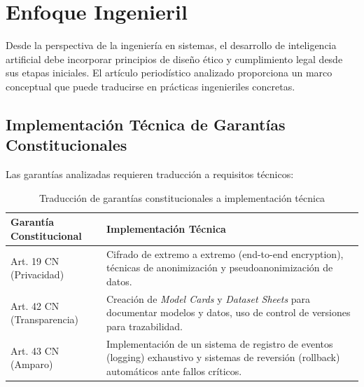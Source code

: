\documentclass[10pt, a4paper]{article}
\begin{document}
\onecolumn %

\section{Enfoque Ingenieril}
\label{sec:enfoque_ingenieril}

Desde la perspectiva de la ingeniería en sistemas, el desarrollo de inteligencia artificial debe incorporar principios de diseño ético y cumplimiento legal desde sus etapas iniciales. El artículo periodístico analizado proporciona un marco conceptual que puede traducirse en prácticas ingenieriles concretas.

\subsection{Implementación Técnica de Garantías Constitucionales}
Las garantías analizadas requieren traducción a requisitos técnicos:

\begin{table}[h]
\centering
\caption{Traducción de garantías constitucionales a implementación técnica}
\begin{tabularx}{\textwidth}{lX}
\toprule
\textbf{Garantía Constitucional} & \textbf{Implementación Técnica} \\
\midrule
Art. 19 CN (Privacidad) & Cifrado de extremo a extremo (end-to-end encryption), técnicas de anonimización y pseudoanonimización de datos. \\
\addlinespace
Art. 42 CN (Transparencia) & Creación de \textit{Model Cards} y \textit{Dataset Sheets} para documentar modelos y datos, uso de control de versiones para trazabilidad. \\
\addlinespace
Art. 43 CN (Amparo) & Implementación de un sistema de registro de eventos (logging) exhaustivo y sistemas de reversión (rollback) automáticos ante fallos críticos. \\
\bottomrule
\end{tabularx}
\end{table}

\printbibliography

\end{document}
